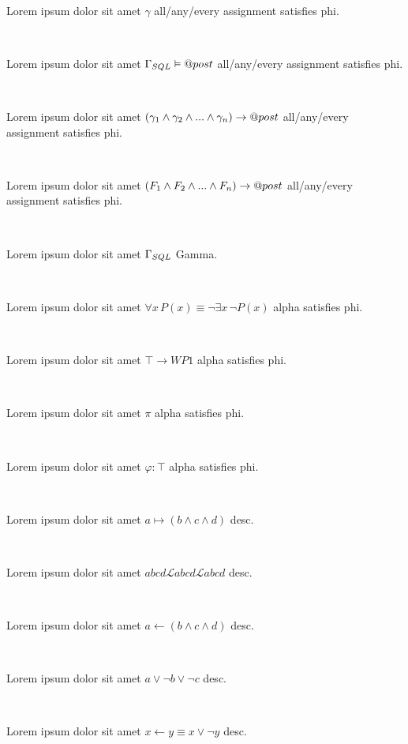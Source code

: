 \documentclass[12pt]{article}
\begin{document}
\centerline{~}

Lorem ipsum dolor sit amet $ \gamma $ all/any/every assignment satisfies phi.

\centerline{~}

Lorem ipsum dolor sit amet $ \Gamma_{\scriptsize SQL} \vDash @post $ all/any/every assignment satisfies phi.

\centerline{~}

Lorem ipsum dolor sit amet $ ( \gamma_{\scriptsize 1} \wedge \gamma_{\scriptsize 2} \wedge ... \wedge \gamma_{\scriptsize n} ) \rightarrow @post $ all/any/every assignment satisfies phi.

\centerline{~}

Lorem ipsum dolor sit amet $ ( F_{\scriptsize 1} \wedge F_{\scriptsize 2} \wedge ... \wedge F_{\scriptsize n} ) \rightarrow @post $ all/any/every assignment satisfies phi.

\centerline{~}

Lorem ipsum dolor sit amet $ \Gamma_{\scriptsize SQL} $ Gamma.

\centerline{~}

Lorem ipsum dolor sit amet $ \forall x \, P(x) \equiv \neg \exists x \, \neg P(x)  $ alpha satisfies phi.

\centerline{~}

Lorem ipsum dolor sit amet $ \top \rightarrow WP1 $ alpha satisfies phi.

\centerline{~}

Lorem ipsum dolor sit amet $ \pi $ alpha satisfies phi.

\centerline{~}

Lorem ipsum dolor sit amet $ \varphi : \top $ alpha satisfies phi.

\centerline{~}

Lorem ipsum dolor sit amet $ a \mapsto ( b \wedge c \wedge d )  $ desc.

\centerline{~}

Lorem ipsum dolor sit amet $ abcd \mathscr{L} abcd \mathcal{L}  abcd $ desc.

\centerline{~}

Lorem ipsum dolor sit amet $ a \leftarrow ( b \wedge c \wedge d )  $ desc.

\centerline{~}

Lorem ipsum dolor sit amet $ a \vee \neg b \vee \neg c $ desc.

\centerline{~}

Lorem ipsum dolor sit amet $ x \leftarrow y \equiv x \vee \neg y $ desc.
\end{document}
